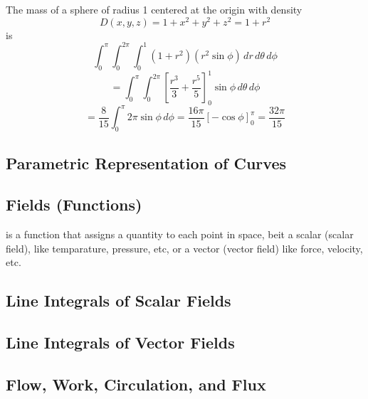 \documentclass[10pt]{book}
\newcommand{\newthought}[1]{\vspace{0.5\baselineskip}\noindent{\scshape #1}}
\begin{document}
The mass of a sphere of radius 1 centered at the origin with density
\[D(x,y,z)=1+x^2+y^2+z^2=1+r^2\]
is
\[\int^{\pi}_{0} \int^{2\pi}_{0} \int^{1}_{0} (1+r^2)(r^2 \sin \phi) \,dr\,d\theta\,d\phi\]
\[= \int^{\pi}_{0} \int^{2\pi}_{0} \left[ \dfrac{r^3}{3}+\dfrac{r^5}{5} \right]^{1}_{0} \sin \phi \,d\theta \,d\phi\]
\[= \dfrac{8}{15} \int_{0}^{\pi} 2\pi \sin \phi \,d\phi = \dfrac{16\pi}{15} \left[ -\cos\phi \right]^{\pi}_{0} = \dfrac{32\pi}{15}\]

\subsection{Parametric Representation of Curves}

\subsection{Fields (Functions)}
\newthought{A field} is a function that assigns a quantity to each point in space, beit a 
scalar (scalar field), like temparature, pressure, etc, or a vector (vector field) like
force, velocity, etc.

\subsection{Line Integrals of Scalar Fields}

\subsection{Line Integrals of Vector Fields}

\subsection{Flow, Work, Circulation, and Flux}
\end{document}
